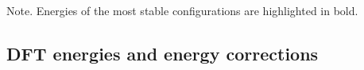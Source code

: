 Note. Energies of the most stable configurations are highlighted in bold.


\subsection{DFT energies and energy corrections}


